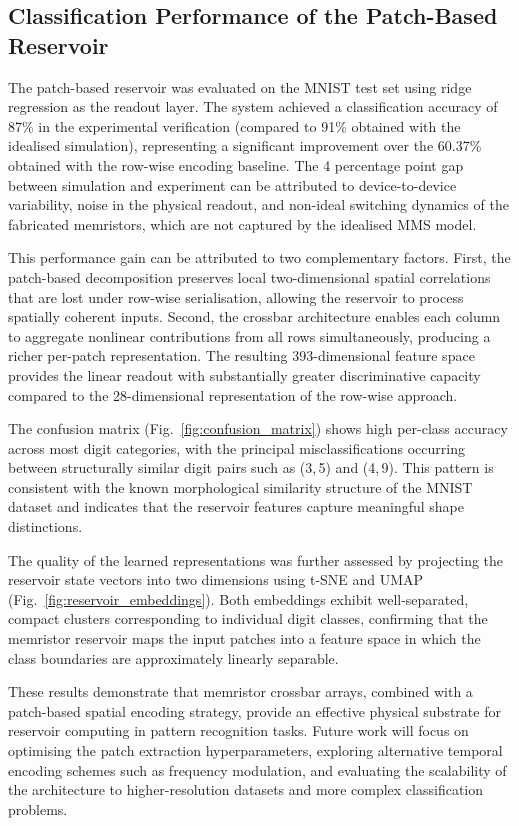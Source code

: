 \documentclass[11pt, oneside]{article}
\begin{document}
\subsection{Classification Performance of the Patch-Based Reservoir}
 
The patch-based reservoir was evaluated on the MNIST test set using ridge regression as the readout layer. The system achieved a classification accuracy of 87\% in the experimental verification (compared to 91\% obtained with the idealised simulation), representing a significant improvement over the 60.37\% obtained with the row-wise encoding baseline. The 4 percentage point gap between simulation and experiment can be attributed to device-to-device variability, noise in the physical readout, and non-ideal switching dynamics of the fabricated memristors, which are not captured by the idealised MMS model.
 
This performance gain can be attributed to two complementary factors. First, the patch-based decomposition preserves local two-dimensional spatial correlations that are lost under row-wise serialisation, allowing the reservoir to process spatially coherent inputs. Second, the crossbar architecture enables each column to aggregate nonlinear contributions from all rows simultaneously, producing a richer per-patch representation. The resulting 393-dimensional feature space provides the linear readout with substantially greater discriminative capacity compared to the 28-dimensional representation of the row-wise approach.
 
The confusion matrix (Fig.~\ref{fig:confusion_matrix}) shows high per-class accuracy across most digit categories, with the principal misclassifications occurring between structurally similar digit pairs such as (3,\,5) and (4,\,9). This pattern is consistent with the known morphological similarity structure of the MNIST dataset and indicates that the reservoir features capture meaningful shape distinctions.
 
The quality of the learned representations was further assessed by projecting the reservoir state vectors into two dimensions using t-SNE and UMAP (Fig.~\ref{fig:reservoir_embeddings}). Both embeddings exhibit well-separated, compact clusters corresponding to individual digit classes, confirming that the memristor reservoir maps the input patches into a feature space in which the class boundaries are approximately linearly separable.
 
These results demonstrate that memristor crossbar arrays, combined with a patch-based spatial encoding strategy, provide an effective physical substrate for reservoir computing in pattern recognition tasks. Future work will focus on optimising the patch extraction hyperparameters, exploring alternative temporal encoding schemes such as frequency modulation, and evaluating the scalability of the architecture to higher-resolution datasets and more complex classification problems.
 
\end{document}
